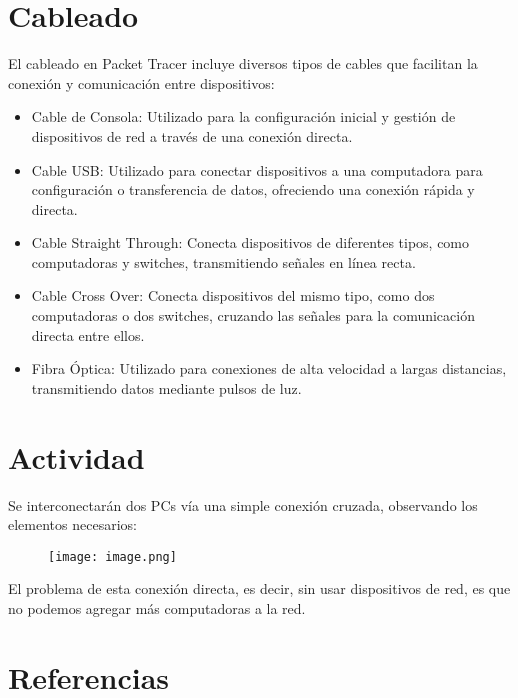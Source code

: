 \documentclass{article}
\begin{document}
\section{Cableado}
    El cableado en Packet Tracer incluye diversos tipos de cables que facilitan la conexión y comunicación entre dispositivos:
        \begin{itemize}
            \item Cable de Consola: Utilizado para la configuración inicial y gestión de dispositivos de red a través de una conexión directa.
            \item Cable USB: Utilizado para conectar dispositivos a una computadora para configuración o transferencia de datos, ofreciendo una conexión rápida y directa.
            \item Cable Straight Through: Conecta dispositivos de diferentes tipos, como computadoras y switches, transmitiendo señales en línea recta.
            \item Cable Cross Over: Conecta dispositivos del mismo tipo, como dos computadoras o dos switches, cruzando las señales para la comunicación directa entre ellos.
            \item Fibra Óptica: Utilizado para conexiones de alta velocidad a largas distancias, transmitiendo datos mediante pulsos de luz.
        \end{itemize}
\section{Actividad}
    Se interconectarán dos PCs vía una simple conexión cruzada, observando los elementos necesarios:
    
    \begin{figure}[h]
        \centering
        \texttt{[image: image.png]}
    \end{figure}
    El problema de esta conexión directa, es decir, sin usar dispositivos de red, es que no podemos agregar más computadoras a la red.
\section{Referencias}
\end{document}
